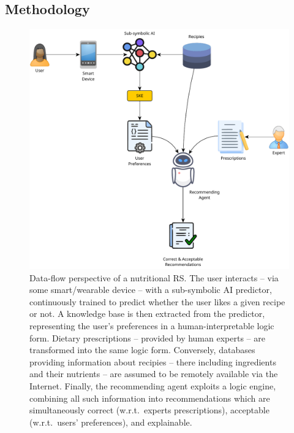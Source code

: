\subsection{Methodology}\label{subsec:methodology}
%
\begin{figure}
  \centering
  \includegraphics[width=\textwidth]{figures/ske-recommender-workflow}
  \caption[Data-flow perspective of a nutritional recommender system]{%
    Data-flow perspective of a nutritional \gls{RS}.
    The user interacts -- via some smart/wearable device -- with a sub-symbolic AI predictor, continuously trained to predict whether the user likes a given recipe or not.
    A knowledge base is then extracted from the predictor, representing the user's preferences in a human-interpretable logic form.
    Dietary prescriptions -- provided by human experts -- are transformed into the same logic form.
    Conversely, databases providing information about recipies -- there including ingredients and their nutrients -- are assumed to be remotely available via the Internet.
    Finally, the recommending agent exploits a logic engine, combining all such information into recommendations which are simultaneously correct (w.r.t.\ experts prescriptions), acceptable (w.r.t.\ users' preferences), and explainable.
  }
  \label{fig:ske-recommender-workflow}
\end{figure}

